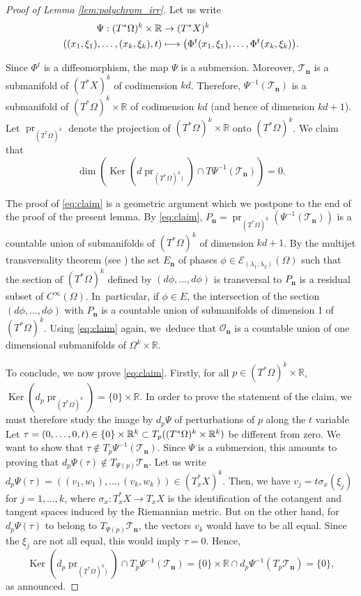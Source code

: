 \documentclass[JEP,XML,SOM,Unicode,published]{cedram}
\let\mathcal\mathscr
\newcommand\mto{\mathchoice{\longmapsto}{\mapsto}{\mapsto}{\mapsto}}
\DeclareMathOperator{\Ker}{Ker}
\theoremstyle{plain}
\theoremstyle{definition}
\newcommand{\R}{\mathbb{R}}
\def\calE{\mathcal{E}}
\def\calT{\mathcal{T}}
\DeclareMathOperator{\pr}{pr}
\begin{document}
\begin{proof}[Proof of Lemma \ref{lem:polychrom_irr}]
Let us write
\begin{align*}
\Psi:(T^*\Omega)^k\times\R&\to (T^*X)^k\\
((x_1,\xi_1),\dots,(x_k,\xi_k),t)&\mto \bigl(\Phi^{t}(x_1,\xi_1),\dots,\Phi^{t}(x_k,\xi_k) \bigr).
\end{align*}

Since $\Phi^{t}$ is a diffeomorphism, the map $\Psi$ is a submersion. Moreover, $\calT_{\boldsymbol{n}}$ is a submanifold of $(T^*X)^k$ of codimension $kd$. Therefore, $\Psi^{-1}(\calT_{\boldsymbol{n}})$ is a submanifold of $(T^*\Omega)^k\times\R$ of codimension $kd$ (and hence of dimension $kd+1$). Let $\pr_{(T^*\Omega)^k}$ denote the projection of $(T^*\Omega)^k\times\R$ onto $(T^*\Omega)^k$. We claim that
\begin{equation}\label{eq:claim}
\dim(\Ker(d\pr_{(T^*\Omega)^k)})\cap T\Psi^{-1}(\calT_{\boldsymbol{n}}))=0.
\end{equation}

The proof of \eqref{eq:claim} is a geometric argument which we postpone to the end of the proof of the present lemma. By \eqref{eq:claim}, $P_{\boldsymbol{n}}=\pr_{(T^*\Omega)^k}(\Psi^{-1}(\calT_{\boldsymbol{n}}))$ is a countable union of submanifolds of $(T^*\Omega)^k$ of dimension $kd+1$. By the multijet transversality theorem (see \cite[Th.\,4.13, Chap.\,2]{GG}) the set $E_{\boldsymbol{n}}$ of phases $\phi\in\calE_{(\lambda_1,\lambda_2)}(\Omega)$ such that the section of $(T^*\Omega)^k$ defined by $(d\phi,\dots,d\phi)$ is transversal to $P_{\boldsymbol{n}}$ is a residual subset of $C^\infty(\Omega)$. In~particular, if $\phi \in E$, the intersection of the section $(d\phi,\dots,d\phi)$ with $P_{\boldsymbol{n}}$ is a countable union of submanifolds of dimension 1 of $(T^*\Omega)^k$.
Using \eqref{eq:claim} again, we~deduce that $\mathcal{O}_{\boldsymbol{n}}$ is a countable union of one dimensional submanifolds of $\Omega^k\times \R$.

To conclude, we now prove \eqref{eq:claim}.
Firstly, for all $p\in (T^*\Omega)^k\times\R$, $\Ker(d_p\pr_{(T^*\Omega)^k})=\{0\}\times\R$. In order to prove the statement of the claim, we must therefore study the image by $d_p\Psi$ of perturbations of $p$ along the $t$ variable Let $\tau =(0,\dots,0, t)\in \{0\}\times\nobreak\R^k\subset T_p((T^*\Omega)^k\times\R^k)$ be different from zero. We want to show that $\tau \notin T_p \Psi^{-1}(\mathcal{T}_{\boldsymbol{n}})$. Since $\Psi$ is a submersion, this amounts to proving that $d_p\Psi(\tau) \notin T_{\Psi(p)}\calT_{\boldsymbol{n}}$. Let us write $d_p\Psi(\tau)=((v_1,w_1),\dots,(v_k,w_k))\in (T_x^*X)^k$. Then, we have $v_j= t \sigma_x(\xi_j)$ for $j=1,\dots,k$, where $\sigma_x : T_x^*X\to T_xX$ is the identification of the cotangent and tangent spaces induced by the Riemannian metric.
But on the other hand, for $d_p\Psi(\tau)$ to belong to $T_{\Psi(p)}\calT_{\boldsymbol{n}}$, the vectors $v_k$ would have to be all equal. Since the $\xi_j$ are not all equal, this would imply $\tau=0$. Hence,
\[
\Ker(d_p\pr_{(T^*\Omega)^k)})\cap T_p\Psi^{-1}(\calT_{\boldsymbol{n}})=\{0\}\times\R\cap d_p\Psi^{-1}(T_p\calT_{\boldsymbol{n}})=\{0\},
\]
as announced.
\end{proof}
\end{document}
